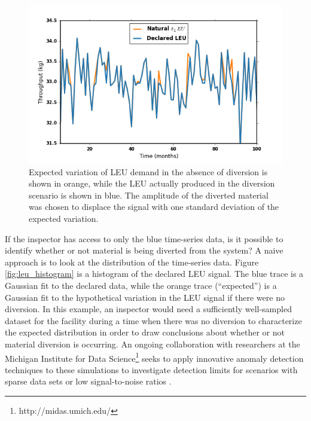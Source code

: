 \begin{figure}
\begin{center}
\includegraphics[natwidth=162bp,natheight=227bp, scale=0.7]{./figs/nat_delta_R5.png}
\end{center}
\caption{Expected variation of \gls{LEU} demand in the absence of diversion is shown in orange, while the \gls{LEU} actually produced in the diversion scenario is shown in blue. The amplitude of the diverted material was chosen to displace the signal with one standard deviation of the expected variation. }
\label{fig:leu_produced}
\end{figure}


If the inspector has access to only the blue time-series data, is it possible to identify whether or not material is being diverted from the system?  A naive approach is to look at the distribution of the time-series data.  Figure \ref{fig:leu_histogram} is a histogram of the declared \gls{LEU} signal.  The blue trace is a Gaussian fit to the declared data, while the orange trace (``expected'') is a Gaussian fit to the hypothetical variation in the \gls{LEU} signal if there were no diversion.  In this example, an inspector would need a sufficiently well-sampled dataset for the facility during a time when there was no diversion to characterize the expected distribution in order to draw conclusions about whether or not material diversion is occurring. An ongoing collaboration with researchers at the Michigan Institute for Data Science\footnote{http://midas.umich.edu/} seeks to apply innovative anomaly detection techniques to these simulations to investigate detection limits for scenarios with sparse data sets or low signal-to-noise ratios .


